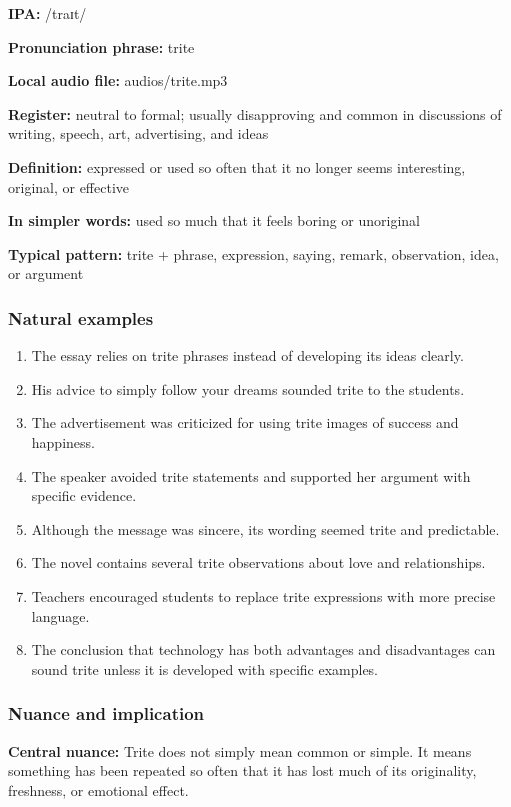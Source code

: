 \documentclass[11pt]{article}
\begin{document}
\textbf{IPA:} /traɪt/

\textbf{Pronunciation phrase:} trite

\textbf{Local audio file:} audios/trite.mp3

\textbf{Register:} neutral to formal; usually disapproving and common in discussions of writing, speech, art, advertising, and ideas

\textbf{Definition:} expressed or used so often that it no longer seems interesting, original, or effective

\textbf{In simpler words:} used so much that it feels boring or unoriginal

\textbf{Typical pattern:} trite + phrase, expression, saying, remark, observation, idea, or argument

\subsubsection{Natural examples}
\begin{enumerate}
  \item The essay relies on trite phrases instead of developing its ideas clearly.
  \item His advice to simply follow your dreams sounded trite to the students.
  \item The advertisement was criticized for using trite images of success and happiness.
  \item The speaker avoided trite statements and supported her argument with specific evidence.
  \item Although the message was sincere, its wording seemed trite and predictable.
  \item The novel contains several trite observations about love and relationships.
  \item Teachers encouraged students to replace trite expressions with more precise language.
  \item The conclusion that technology has both advantages and disadvantages can sound trite unless it is developed with specific examples.
\end{enumerate}

\subsubsection{Nuance and implication}
\textbf{Central nuance:} Trite does not simply mean common or simple. It means something has been repeated so often that it has lost much of its originality, freshness, or emotional effect.
\end{document}
